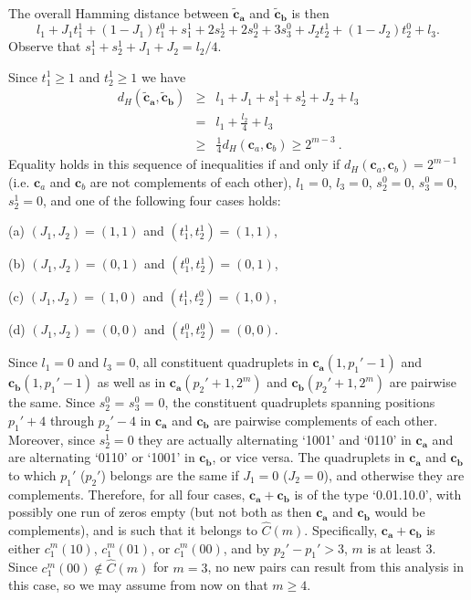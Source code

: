 The overall Hamming distance between $\mathbf{\tilde{c}_a}$ and
$\mathbf{\tilde{c}_b}$ is then
\[l_1+J_1t_1^1+(1-J_1)t_1^0+s_{1}^1+2s_{2}^1+2s_{2}^0+3
s_{3}^0+J_2t_2^1+(1-J_2)t_2^0+l_3.\] Observe that
$s_{1}^1+s_{2}^1+J_1+J_2=l_2/4$.

Since $t_{1}^1 \ge 1$ and $t_{2}^1 \ge 1$ we have
\begin{eqnarray*}
d_H(\mathbf{\tilde{c}_a}, \mathbf{\tilde{c}_b}) &\ge&
l_1 + J_1 + s_{1}^1 + s_{2}^1 + J_2 + l_3\\
&=& l_1 + \frac{l_2}{4} + l_3\\
&\ge& \frac{1}{4} d_H(\mathbf{c}_a, \mathbf{c}_b) \ge 2^{m-3}~.
\end{eqnarray*}
Equality holds in this sequence of inequalities if and only if
$d_H(\mathbf{c}_a, \mathbf{c}_b) = 2^{m-1}$ (i.e. $\mathbf{c}_a$
and $\mathbf{c}_b$ are not complements of each other), $l_1 = 0$,
$l_3 =0$, $s_{2}^0 = 0$, $s_{3}^0 = 0$, $s_{2}^1 = 0$, and one of
the following four cases holds:

(a) $(J_1, J_2) = (1, 1)$ and $(t_{1}^1, t_{2}^1) = (1, 1)$,

(b) $(J_1, J_2) = (0, 1)$ and $(t_{1}^0, t_{2}^1) = (0, 1)$,

(c) $(J_1, J_2) = (1, 0)$ and $(t_{1}^1, t_{2}^0) = (1, 0)$,

(d) $(J_1, J_2) = (0, 0)$ and $(t_{1}^0, t_{2}^0) = (0, 0)$.


Since $l_1=0$ and $l_3=0$, all constituent quadruplets in
$\mathbf{c_a}(1,p_1'-1)$ and $\mathbf{c_b}(1,p_1'-1)$ as well as
in $\mathbf{c_a}(p_2'+1,2^m)$ and $\mathbf{c_b}(p_2'+1,2^m)$ are
pairwise the same. Since $s_{2}^0$ = $s_{3}^0$ = $0$, the
constituent quadruplets spanning positions $p_1'+4$ through
$p_2'-4$ in $\mathbf{c_a}$ and $\mathbf{c_b}$ are pairwise
complements of each other. Moreover, since $s_2^1=0$ they are
actually alternating `1001' and `0110' in $\mathbf{c_a}$ and are
alternating `0110' or `1001' in $\mathbf{c_b}$, or vice versa. The
quadruplets in $\mathbf{c_a}$ and $\mathbf{c_b}$ to which $p_1'$
($p_2'$) belongs are the same if $J_1=0$ ($J_2=0$), and otherwise
they are complements. Therefore, for all four cases,
$\mathbf{c_a}+\mathbf{c_b}$ is of the type `0.01.10.0', with
possibly one run of zeros empty (but not both as then
$\mathbf{c_a}$ and $\mathbf{c_b}$ would be complements), and is
such that it belongs to $\hat{C}(m)$. Specifically,
$\mathbf{c_a}+\mathbf{c_b}$ is either $c_1^m(10)$, $c_1^m(01)$, or
$c_1^m(00)$, and by $p_2'-p_1'>3$, $m$ is at least 3. Since
$c_1^m(00) \notin \hat{C}(m)$ for $m =3$, no new pairs can result
from this analysis in this case, so we may assume from now on that
$m \ge 4$.

